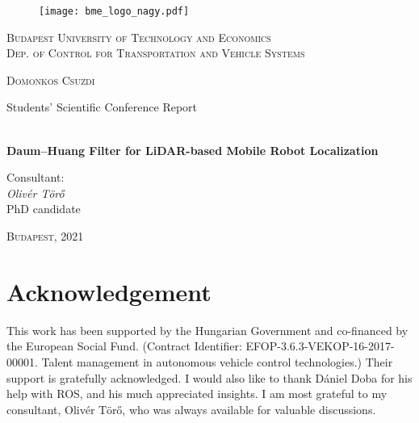 \documentclass[a4paper, 12pt]{paper}
\begin{document}
\begin{center}
    \begin{figure}[!h]
        \centering
        \texttt{[image: bme\_logo\_nagy.pdf]}
    \end{figure}
    \large\textsc{Budapest University of Technology and Economics\\
        Dep. of Control for Transportation
        and Vehicle Systems}
\end{center}
\thispagestyle{empty}
{\centering

    {\LARGE\textsc{Domonkos Csuzdi}

        \LARGE{Students' Scientific Conference Report}}

    {\Large\textbf{\\Daum--Huang Filter for LiDAR-based Mobile Robot Localization}}\\

    }

\begin{flushleft}
    \begin{minipage}{0.3\linewidth}
        \large{Consultant}:\\
        \forceindent \textit{Olivér Törő}\\
        \forceindent PhD candidate
    \end{minipage}
\end{flushleft}



\begin{center}
    {\Large\textsc{Budapest, }2021 }
\end{center}
\newpage
\thispagestyle{empty}
\newpage
\section*{Acknowledgement}
This work has been supported by the Hungarian Government and co-financed by the European Social Fund. (Contract Identifier: EFOP-3.6.3-VEKOP-16-2017-00001. Talent management in autonomous vehicle control technologies.) Their support is gratefully acknowledged.
I would also like to thank Dániel Doba for his help with ROS, and his much appreciated insights.
I am most grateful to my consultant, Olivér Törő, who was always available for valuable discussions.
\clearpage
\tableofcontents
\pagebreak
{}
\pagestyle{fancy}
\end{document}
